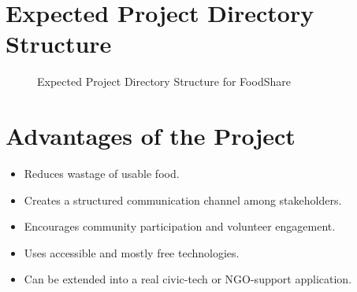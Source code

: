 \documentclass[12pt,a4paper]{report}
\newcommand{\projecttitle}{FoodShare}
\begin{document}
\section{Expected Project Directory Structure}
\begin{figure}[H]
\centering
{}
\caption{Expected Project Directory Structure for \projecttitle}
\end{figure}

\section{Advantages of the Project}
\begin{itemize}[leftmargin=1.2cm]
\item Reduces wastage of usable food.
\item Creates a structured communication channel among stakeholders.
\item Encourages community participation and volunteer engagement.
\item Uses accessible and mostly free technologies.
\item Can be extended into a real civic-tech or NGO-support application.
\end{itemize}
\end{document}
